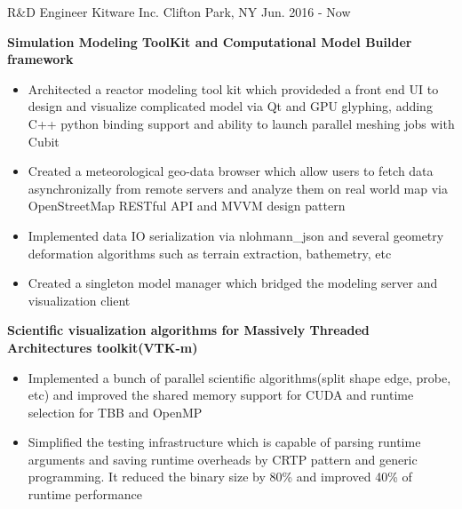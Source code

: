 

\begin{cventries}

  \cventry
    {R\&D Engineer} %
    {Kitware Inc.} %
    {Clifton Park, NY} %
    {Jun. 2016 - Now} %
    {
      \begin{cvitems} %
        \item {\fontsize{10pt}{1em}\bodyfont\bfseries\color{darktext}Simulation Modeling ToolKit and Computational Model Builder framework}
          \begin{itemize}
              \item {Architected a reactor modeling tool kit which provideded a front end UI to design and visualize complicated model via Qt and GPU glyphing, adding C++ python binding support and ability to launch parallel meshing jobs with Cubit}
              \item {Created a meteorological geo-data browser which allow users to fetch data asynchronizally from remote servers and analyze them on real world map via OpenStreetMap RESTful API and MVVM design pattern}
              \item {Implemented data I\/O serialization via nlohmann\_json and several geometry deformation algorithms such as terrain extraction, bathemetry, etc}
              \item {Created a singleton model manager which bridged the modeling server and visualization client\\}
          \end{itemize}
        \item {\fontsize{10pt}{1em}\bodyfont\bfseries\color{darktext}Scientific visualization algorithms for Massively Threaded Architectures toolkit(VTK-m)}
          \begin{itemize}
              \item {Implemented a bunch of parallel scientific algorithms(split shape edge, probe, etc) and improved the shared memory support for CUDA and runtime selection for TBB and OpenMP}
              \item {Simplified the testing infrastructure which is capable of parsing runtime arguments and saving runtime overheads by CRTP pattern and generic programming. It reduced the binary size by 80\% and improved 40\% of runtime performance}

\end{itemize}
\end{cvitems}}
\end{cventries}
